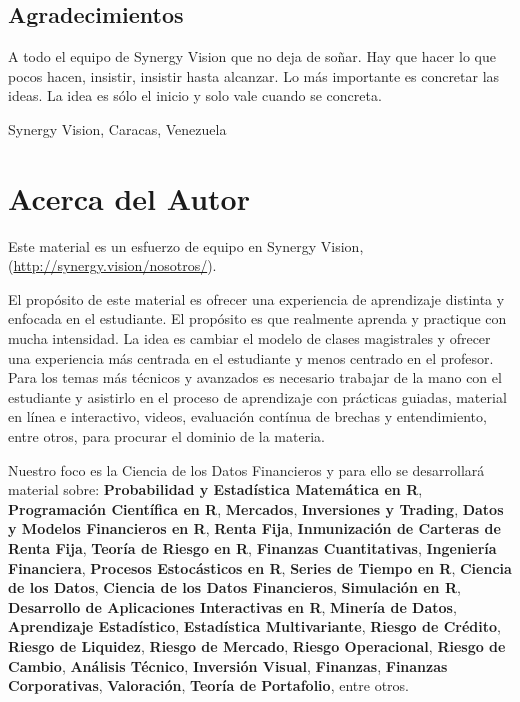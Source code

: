 \documentclass[
  12pt,
]{krantz}
\let\BeginKnitrBlock\begin \let\EndKnitrBlock\end
\begin{document}
\hypertarget{agradecimientos}{%
\section*{Agradecimientos}\label{agradecimientos}}


A todo el equipo de Synergy Vision que no deja de soñar. Hay que hacer lo que pocos hacen, insistir, insistir hasta alcanzar. Lo más importante es concretar las ideas. La idea es sólo el inicio y solo vale cuando se concreta.

\BeginKnitrBlock{flushright}
Synergy Vision, Caracas, Venezuela
\EndKnitrBlock{flushright}

\hypertarget{acerca-del-autor}{%
\chapter*{Acerca del Autor}\label{acerca-del-autor}}


Este material es un esfuerzo de equipo en Synergy Vision, (\url{http://synergy.vision/nosotros/}).

El propósito de este material es ofrecer una experiencia de aprendizaje distinta y enfocada en el estudiante. El propósito es que realmente aprenda y practique con mucha intensidad. La idea es cambiar el modelo de clases magistrales y ofrecer una experiencia más centrada en el estudiante y menos centrado en el profesor. Para los temas más técnicos y avanzados es necesario trabajar de la mano con el estudiante y asistirlo en el proceso de aprendizaje con prácticas guiadas, material en línea e interactivo, videos, evaluación contínua de brechas y entendimiento, entre otros, para procurar el dominio de la materia.

Nuestro foco es la Ciencia de los Datos Financieros y para ello se desarrollará material sobre: \textbf{Probabilidad y Estadística Matemática en R}, \textbf{Programación Científica en R}, \textbf{Mercados}, \textbf{Inversiones y Trading}, \textbf{Datos y Modelos Financieros en R}, \textbf{Renta Fija}, \textbf{Inmunización de Carteras de Renta Fija}, \textbf{Teoría de Riesgo en R}, \textbf{Finanzas Cuantitativas}, \textbf{Ingeniería Financiera}, \textbf{Procesos Estocásticos en R}, \textbf{Series de Tiempo en R}, \textbf{Ciencia de los Datos}, \textbf{Ciencia de los Datos Financieros}, \textbf{Simulación en R}, \textbf{Desarrollo de Aplicaciones Interactivas en R}, \textbf{Minería de Datos}, \textbf{Aprendizaje Estadístico}, \textbf{Estadística Multivariante}, \textbf{Riesgo de Crédito}, \textbf{Riesgo de Liquidez}, \textbf{Riesgo de Mercado}, \textbf{Riesgo Operacional}, \textbf{Riesgo de Cambio}, \textbf{Análisis Técnico}, \textbf{Inversión Visual}, \textbf{Finanzas}, \textbf{Finanzas Corporativas}, \textbf{Valoración}, \textbf{Teoría de Portafolio}, entre otros.
\end{document}
